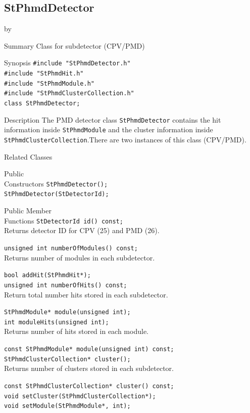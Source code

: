 \documentclass[twoside]{article}
\newcommand{\entrylabel}[1]{\mbox{\textbf{{#1}}}\hfil}%
\newenvironment{entry}
{\begin{list}{}%
    {\renewcommand{\makelabel}{\entrylabel}%
     \setlength{\labelwidth}{90pt}%
     \setlength{\leftmargin}{\labelwidth}
     \advance\leftmargin by \labelsep%
      }%
    }%
  {\end{list}}
\newcommand{\Entrylabel}[1]%
{\raisebox{0pt}[1ex][0pt]{\makebox[\labelwidth][l]%
    {\parbox[t]{\labelwidth}{\hspace{0pt}\textbf{{#1}}}}}}
\newenvironment{Entry}%
{\renewcommand{\entrylabel}{\Entrylabel}\begin{entry}}%
  {\end{entry}}
\begin{document}
\subsection{StPhmdDetector}
\label{sec:StPhmdDetector}
\begin{Entry}
\item[Summary]Class for subdetector (CPV/PMD)

\item[Synopsis]
    \verb+#include "StPhmdDetector.h"+\\
    \verb+#include "StPhmdHit.h"+\\
    \verb+#include "StPhmdModule.h"+\\
    \verb+#include "StPhmdClusterCollection.h"+\\
    \verb+class StPhmdDetector;+\\
\item[Description]
 The PMD detector class \texttt{StPhmdDetector} contains the
hit information inside \texttt{StPhmdModule} and the cluster 
information inside \texttt{StPhmdClusterCollection}.There are two instances of
 this class (CPV/PMD).

\item[Related Classes]
\item[Public\\ Constructors]
    \verb+StPhmdDetector();+\\
    \verb+StPhmdDetector(StDetectorId);+\\
\item[Public Member\\ Functions]
    \verb+StDetectorId id() const;+\\
    Returns detector ID for CPV (25) and PMD (26).

    \verb+unsigned int numberOfModules() const;+\\
    Returns number of modules in each subdetector.

    \verb+bool addHit(StPhmdHit*);+\\
    \verb+unsigned int numberOfHits() const;+\\
    Return total number hits stored in each subdetector.

    \verb+StPhmdModule* module(unsigned int);+\\
    \verb+int moduleHits(unsigned int);+\\
    Returns number of hits stored in each module.

    \verb+const StPhmdModule* module(unsigned int) const;+\\
    \verb+StPhmdClusterCollection* cluster();+\\
    Returns number of clusters stored in each subdetector.

    \verb+const StPhmdClusterCollection* cluster() const;+\\

    \verb+void setCluster(StPhmdClusterCollection*);+\\
    \verb+void setModule(StPhmdModule*, int);+\\
\end{Entry}
\clearpage
\end{document}
